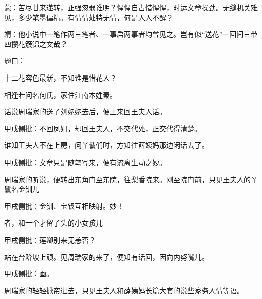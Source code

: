 \begin{parag}
    \begin{note}蒙：苦尽甘来递转，正强忽弱谁明？惺惺自古惜惺惺，时运文章操劲。无缝机关难见，多少笔墨偏精。有情情处特无情，何是人人不醒？\end{note}
\end{parag}


\begin{parag}
    \begin{note}靖：他小说中一笔作两三笔者、一事启两事者均曾见之。岂有似“送花”一回间三带四攒花簇锦之文哉？\end{note}
\end{parag}


\begin{parag}
    题曰：
\end{parag}

\begin{poem}
    \begin{pl}十二花容色最新，不知谁是惜花人？\end{pl}

    \begin{pl}相逢若问名何氏，家住江南本姓秦。\end{pl}
\end{poem}


\begin{parag}
    话说周瑞家的送了刘姥姥去后，便上来回王夫人话。\begin{note}甲戌侧批：不回凤姐，却回王夫人，不交代处，正交代得清楚。\end{note}谁知王夫人不在上房，问丫鬟们时，方知往薛姨妈那边闲话去了。\begin{note}甲戌侧批：文章只是随笔写来，便有流离生动之妙。\end{note}周瑞家的听说，便转出东角门至东院，往梨香院来。刚至院门前，只见王夫人的丫鬟名金钏儿\begin{note}甲戌侧批：金钏、宝钗互相映射。妙！\end{note}者，和一个才留了头的小女孩儿\begin{note}甲戌侧批：莲卿别来无恙否？\end{note}站在台阶坡上顽。见周瑞家的来了，便知有话回，因向内努嘴儿。\begin{note}甲戌侧批：画。\end{note}周瑞家的轻轻掀帘进去，只见王夫人和薛姨妈长篇大套的说些家务人情等语。
\end{parag}


